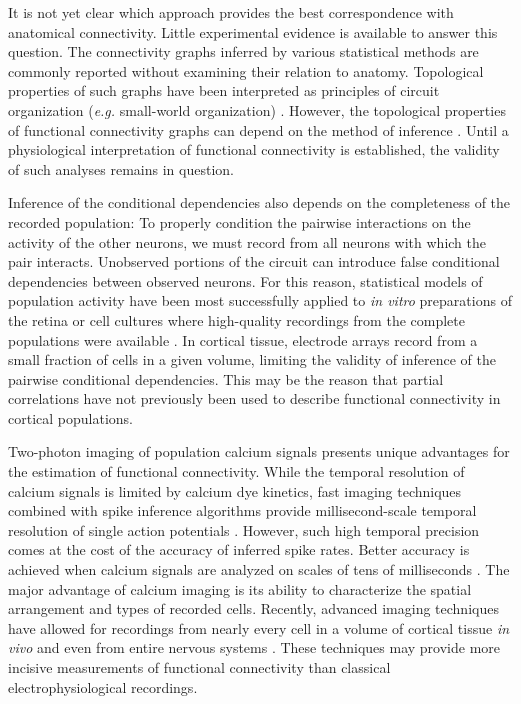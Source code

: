 \documentclass[10pt]{article}
\begin{document}
It is not yet clear which approach provides the best correspondence with anatomical connectivity. Little experimental evidence is available to answer this question.  The connectivity graphs inferred by various statistical methods are commonly reported without examining their relation to anatomy.  
Topological properties of such graphs have been interpreted as principles of circuit organization (\emph{e.g.} small-world organization) \cite{Feldt:2011, Yu:2008, Malmersjo:2013}.  However, the topological properties of functional connectivity graphs can depend on the method of inference \cite{Zalesky:2012}. Until a physiological interpretation of functional connectivity is established, the validity of such analyses remains in question.


Inference of the conditional dependencies also depends on the completeness of the recorded population:  To properly condition the pairwise interactions on the activity of the other neurons, we must record from all neurons with which the pair interacts. Unobserved portions of the circuit can introduce false conditional dependencies between observed neurons. For this reason, statistical models of population activity have been most successfully applied to \emph{in vitro} preparations of the retina or cell cultures where high-quality recordings from the complete populations were available \cite{Pillow:2008}. In cortical tissue, electrode arrays record from a small fraction of cells in a given volume, limiting the validity of inference of the pairwise conditional dependencies. This may be the reason that partial correlations have not previously been used to describe  functional connectivity in cortical populations. 


Two-photon imaging of population calcium signals presents unique advantages for the estimation of functional connectivity.  While the temporal resolution of calcium signals is limited by calcium dye kinetics, fast imaging techniques combined with spike inference algorithms provide millisecond-scale temporal resolution of single action potentials \cite{Grewe:2010}. However, such high temporal precision comes at the cost of the accuracy of inferred spike rates.  Better accuracy is achieved when calcium signals are analyzed on scales of tens of milliseconds \cite{Cotton:2013}.  The major advantage of calcium imaging is its ability to characterize the spatial arrangement and types of recorded cells.  Recently, advanced imaging techniques have allowed for recordings from nearly every cell in a volume of cortical tissue  \emph{in vivo} \cite{Katona:2012, Cotton:2013} and even from entire nervous systems \cite{Leung:2013, Ahrens:2013}.  These techniques may provide more incisive measurements of functional connectivity than classical electrophysiological recordings.  
\end{document}
